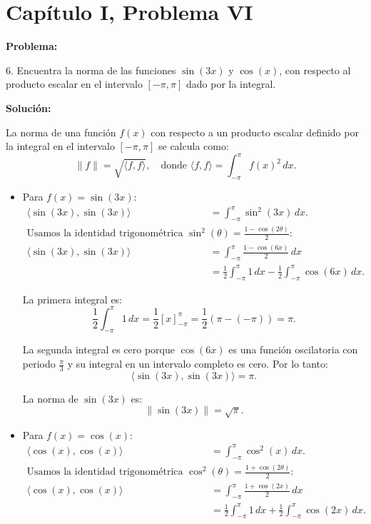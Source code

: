 \section*{Capítulo I, Problema VI}

\textbf{Problema:}

6. Encuentra la norma de las funciones $\sin(3x)$ y $\cos(x)$, con respecto al producto escalar en el intervalo $[-\pi, \pi]$ dado por la integral.

\textbf{Solución:}

La norma de una función $f(x)$ con respecto a un producto escalar definido por la integral en el intervalo $[-\pi, \pi]$ se calcula como:
\[
    \|f\| = \sqrt{\langle f, f \rangle}, \quad \text{donde } \langle f, f \rangle = \int_{-\pi}^{\pi} f(x)^2 \, dx.
\]

\begin{itemize}
    \item Para $f(x) = \sin(3x)$:
    \begin{align*}
        \langle \sin(3x), \sin(3x) \rangle &= \int_{-\pi}^{\pi} \sin^2(3x) \, dx. \\
        \text{Usamos la identidad trigonométrica } \sin^2(\theta) = \frac{1 - \cos(2\theta)}{2}: \\
        \langle \sin(3x), \sin(3x) \rangle &= \int_{-\pi}^{\pi} \frac{1 - \cos(6x)}{2} \, dx \\
        &= \frac{1}{2} \int_{-\pi}^{\pi} 1 \, dx - \frac{1}{2} \int_{-\pi}^{\pi} \cos(6x) \, dx.
    \end{align*}

    La primera integral es:
    \[
        \frac{1}{2} \int_{-\pi}^{\pi} 1 \, dx = \frac{1}{2} [x]_{-\pi}^{\pi} = \frac{1}{2} (\pi - (-\pi)) = \pi.
    \]

    La segunda integral es cero porque $\cos(6x)$ es una función oscilatoria con periodo $\frac{\pi}{3}$ y su integral en un intervalo completo es cero. Por lo tanto:
    \[
        \langle \sin(3x), \sin(3x) \rangle = \pi.
    \]

    La norma de $\sin(3x)$ es:
    \[
        \|\sin(3x)\| = \sqrt{\pi}.
    \]

    \item Para $f(x) = \cos(x)$:
    \begin{align*}
        \langle \cos(x), \cos(x) \rangle &= \int_{-\pi}^{\pi} \cos^2(x) \, dx. \\
        \text{Usamos la identidad trigonométrica } \cos^2(\theta) = \frac{1 + \cos(2\theta)}{2}: \\
        \langle \cos(x), \cos(x) \rangle &= \int_{-\pi}^{\pi} \frac{1 + \cos(2x)}{2} \, dx \\
        &= \frac{1}{2} \int_{-\pi}^{\pi} 1 \, dx + \frac{1}{2} \int_{-\pi}^{\pi} \cos(2x) \, dx.
    \end{align*}


\end{itemize}
